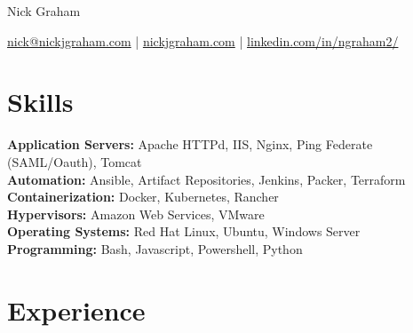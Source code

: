 \documentclass[11pt]{article}       %
\begin{document}
\centerline{\Huge Nick Graham}

\vspace{5pt}

\centerline{\href{mailto:nick@nickjgraham.com}{nick@nickjgraham.com} | \href{https://nickjgraham.com}{nickjgraham.com} | \href{https://linkedin.com/in/ngraham2/}{linkedin.com/in/ngraham2/}}

\vspace{-10pt}

\section*{Skills}

\textbf{Application Servers:} Apache HTTPd, IIS, Nginx, Ping Federate (SAML/Oauth), Tomcat \\

\textbf{Automation:} Ansible, Artifact Repositories, Jenkins, Packer, Terraform \\

\textbf{Containerization:} Docker, Kubernetes, Rancher \\

\textbf{Hypervisors:} Amazon Web Services, VMware \\

\textbf{Operating Systems:} Red Hat Linux, Ubuntu, Windows Server \\

\textbf{Programming:} Bash, Javascript, Powershell, Python \\


\vspace{-6.5pt}

\section*{Experience}
\end{document}
